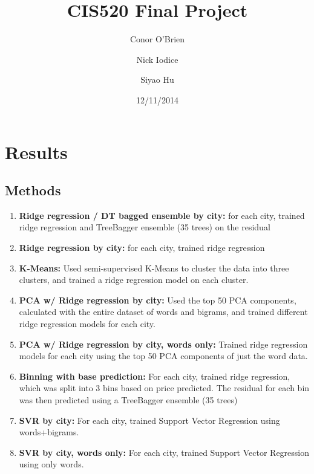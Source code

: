 \documentclass[11pt]{article}
\title{CIS520 Final Project}
\author{Conor O'Brien \and Nick Iodice \and Siyao Hu}
\date{12/11/2014}
\begin{document}
\maketitle

\section{Results}

\subsection*{Methods}
\begin{enumerate}
	\item \textbf{Ridge regression / DT bagged ensemble by city:} for each city, trained ridge regression and TreeBagger ensemble (35 trees) on the residual
	\item \textbf{Ridge regression by city:} for each city, trained ridge regression
	\item \textbf{K-Means:} Used semi-supervised K-Means to cluster the data into three clusters, and trained a ridge regression model on each cluster. 
	\item \textbf{PCA w/ Ridge regression by city:} Used the top 50 PCA components, calculated with the entire dataset of words and bigrams, and trained different  ridge regression models for each city.
	\item \textbf{PCA w/ Ridge regression by city, words only:} Trained ridge regression models for each city using the top 50 PCA components of just the word data.
	\item \textbf{Binning with base prediction:} For each city, trained ridge regression, which was split into 3 bins based on price predicted. The residual for each bin was then predicted using a TreeBagger ensemble (35 trees)
	\item \textbf{SVR by city:} For each city, trained Support Vector Regression using words+bigrams.
	\item \textbf{SVR by city, words only:} For each city, trained Support Vector Regression using only words.
\end{enumerate}
\end{document}
